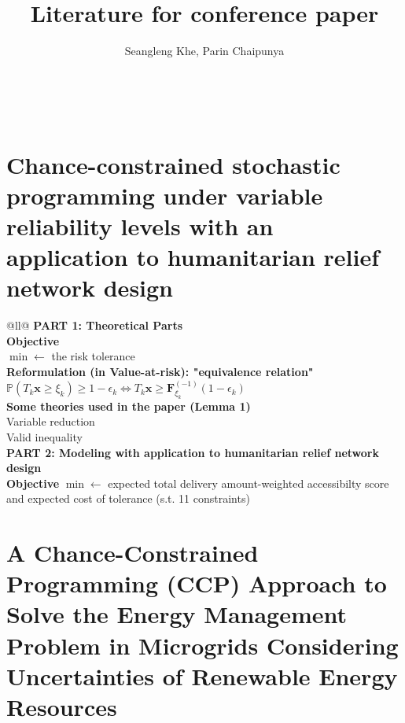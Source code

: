 \documentclass[11pt, oneside, reqno]{amsbook}
\title{Literature for conference paper}
\author{Seangleng Khe, Parin Chaipunya}
\begin{document}
\begin{center}
  \huge{\bfseries\thetitle} \\[1em]
  \Large\theauthor
\end{center}
\vspace{10em}

\begingroup
\let\clearpage\relax
\tableofcontents
\endgroup

\chapter{Chance-constrained stochastic programming under variable reliability levels with an application to humanitarian relief network design}


\begin{longtblr}[caption={Summary of Model of \cite{elci2018}}]{@{}ll@{}}
  \hline\hline
  { \bfseries PART 1: Theoretical Parts} \\
  \hline
  { \bfseries Objective} \\
  $\min \leftarrow$ the risk tolerance \\
  \hline\hline
  {\bfseries Reformulation (in Value-at-risk): "equivalence relation"} \\
  $\mathbb{P} (T_k \textbf{x} \ge \xi_k ) \ge 1 - \epsilon_k \Leftrightarrow T_k \textbf{x} \ge \textbf{F}^{(-1)}_{\xi_k} (1 - \epsilon_k )$ \\
  \hline\hline
  {\bfseries Some theories used in the paper (Lemma 1)} \\ 
  Variable reduction \\
  Valid inequality
  \\ \hline \hline
  {\bfseries PART 2: Modeling with application to humanitarian relief network design} \\
  \hline 
  {\bfseries Objective} 
  $\min \leftarrow$ expected total delivery amount-weighted accessibilty score \\
  and expected cost of tolerance (s.t. 11 constraints)\\
  \hline \hline
\end{longtblr}



\chapter{A Chance-Constrained Programming (CCP) Approach to Solve the Energy Management Problem in Microgrids Considering Uncertainties of Renewable Energy Resources}
\end{document}
